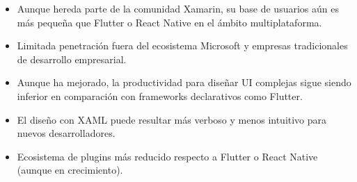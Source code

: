 \begin{itemize}
    \item Aunque hereda parte de la comunidad Xamarin, su base de usuarios aún es más pequeña que Flutter o React Native en el ámbito multiplataforma.
    \item Limitada penetración fuera del ecosistema Microsoft y empresas tradicionales de desarrollo empresarial.
    \item Aunque ha mejorado, la productividad para diseñar UI complejas sigue siendo inferior en comparación con frameworks declarativos como Flutter.
    \item El diseño con XAML puede resultar más verboso y menos intuitivo para nuevos desarrolladores.
    \item Ecosistema de plugins más reducido respecto a Flutter o React Native (aunque en crecimiento).
\end{itemize}

